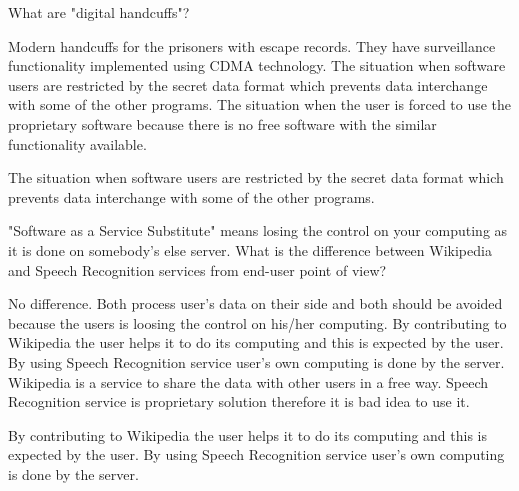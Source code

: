 \begin{question}[type=exam]
What are "digital handcuffs"?
\begin{itemize}
\chk Modern handcuffs for the prisoners with escape records. They have surveillance functionality implemented using CDMA technology.
\chk The situation when software users are restricted by the secret data format which prevents data interchange with some of the other programs.
\chk The situation when the user is forced to use the proprietary software because there is no free software with the similar functionality available.
\end{itemize}
\end{question}
\begin{solution}
The situation when software users are restricted by the secret data format which prevents data interchange with some of the other programs.
\end{solution}

\begin{question}[type=exam]
"Software as a Service Substitute" means losing the control on your computing as it is done on somebody's else server. What is the difference between Wikipedia and Speech Recognition services from end-user point of view?
\begin{itemize}
\chk No difference. Both process user's data on their side and both should be avoided because the users is loosing the control on his/her computing.
\chk By contributing to Wikipedia the user helps it to do its computing and this is expected by the user. By using Speech Recognition service user's own computing is done by the server.
\chk Wikipedia is a service to share the data with other users in a free way. Speech Recognition service is proprietary solution therefore it is bad idea to use it.
\end{itemize}
\end{question}
\begin{solution}
By contributing to Wikipedia the user helps it to do its computing and this is expected by the user. By using Speech Recognition service user's own computing is done by the server.
\end{solution}

